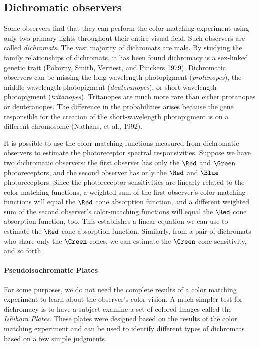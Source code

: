 \subsection*{Dichromatic observers}
Some observers find that they can perform the color-matching
experiment using only two primary lights
throughout their entire visual field.
Such observers are called {\em dichromats}.
The vast majority of dichromats are male.
By studying the family relationships of dichromats, it has
been found dichromacy is a sex-linked genetic trait
(Pokorny, Smith, Verriest, and Pinckers 1979).
Dichromatic observers can be missing the
long-wavelength photopigment ({\em protanopes}),
the middle-wavelength photopigment ({\em deuteranopes}),
or short-wavelength photopigment ({\em tritanopes}).
Tritanopes are much more rare than either protanopes
or deuteranopes.
The difference in the probabilities
arises because
the gene responsible for the creation of the short-wavelength
photopigment is on a different chromosome (Nathans, et al., 1992).

It is possible to use the color-matching functions measured
from dichromatic observers to estimate the photoreceptor
spectral responsivities.
Suppose we have two dichromatic observers:  the first observer
has only the $\Red$ and $\Green$ photoreceptors,
and the second observer
has only the $\Red$ and $\Blue$ photoreceptors.
Since the photoreceptor sensitivities are linearly related
to the color matching functions, a weighted sum of the
first observer's color-matching functions
will equal the $\Red$ cone absorption function,
and a different weighted sum of the second
observer's color-matching functions
will equal the $\Red$ cone absorption function, too.
This establishes a linear
equation we can use
to estimate the $\Red$ cone absorption function.
Similarly, from a pair of dichromats who share
only the $\Green$ cones,
we can estimate the $\Green$ cone sensitivity, and so forth.

\paragraph{Pseudoisochromatic Plates}
For some purposes,
we do not need the complete
results of a color matching experiment to
learn about the observer's color vision.
A much simpler test for dichromacy is to have a subject
examine a set of colored images
called the {\em Ishihara Plates}.
These plates were designed based on the results of the
color matching experiment and can be used to identify
different types of dichromats
based on a few simple judgments.

